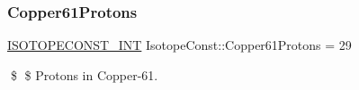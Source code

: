 \subsubsection{\texorpdfstring{Copper61\+Protons}{Copper61Protons}}
{\footnotesize\ttfamily \mbox{\hyperlink{group___isotope_const-_macros_ga5f18360b3e99483a35c32d789e62621c}{I\+S\+O\+T\+O\+P\+E\+C\+O\+N\+S\+T\+\_\+\+I\+NT}} Isotope\+Const\+::\+Copper61\+Protons = 29}

\$ \$ Protons in Copper-\/61. 